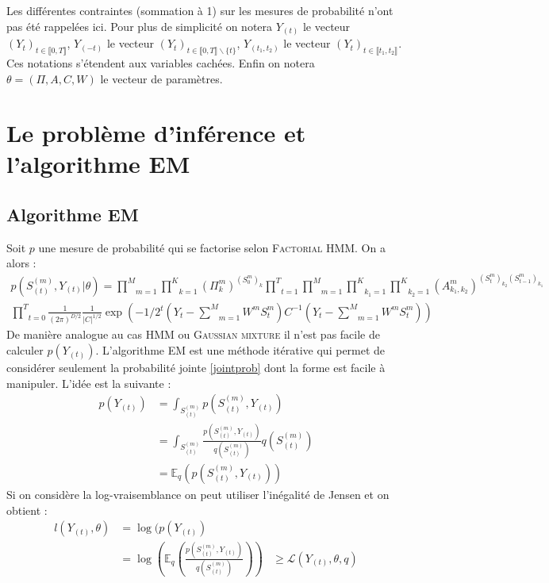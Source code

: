 \documentclass[10pt,a4paper]{article}
\newcommand{\hmm}{\textsc{HMM}}
\newcommand{\fhmm}{\textsc{Factorial HMM}}
\newcommand{\EM}{\textsc{EM}}
\begin{document}
Les différentes contraintes (sommation à 1) sur les mesures de probabilité 
n'ont pas été rappelées ici. Pour plus de simplicité on notera $Y_{(t)}$ le 
vecteur $(Y_t)_{t \in \llbracket 0,T \rrbracket}$, $Y_{(-t)}$ le vecteur 
$(Y_{t})_{t \in \llbracket 0,T \rrbracket\backslash \lbrace t \rbrace}$, 
$Y_{(t_1,t_2)}$ le vecteur $(Y_t)_{t \in \llbracket t_1,t_2 \rrbracket}$. Ces 
notations s'étendent aux variables cachées. Enfin on notera $\theta=(\Pi, 
A,C,W)$ le vecteur de paramètres.
\section{Le problème d'inférence et l'algorithme EM}
\subsection{Algorithme EM}
Soit $p$ une mesure de probabilité qui se factorise selon \fhmm. On a alors :
\begin{multline}
p(S_{(t)}^{(m)},Y_{(t)} \vert 
\theta)=\underset{m=1}{\overset{M}{\prod}}\underset{k=1}{\overset{K}{\prod}}
(\Pi_k^m)^{(S_0^m)_k}\underset{t=1}{\overset{T}{\prod}}\underset{m=1}{\overset{M
}{\prod}}\underset{k_1=1}{\overset{K}{\prod}}\underset{k_2=1}{\overset{K}{\prod}
}(A_{k_1,k_2}^m)^{(S_t^m)_{k_2}(S_{t-1}^m)_{k_1}}\\ 
\underset{t=0}{\overset{T}{\prod}}\frac{1}{(2\pi)^{D/2}}\frac{1}{\vert C  
\vert^{1/2}}\exp\left(-1/2 {}^t\left(Y_t- \underset{m=1}{\overset{M}{\sum}}W^m 
S_t^m \right)C^{-1} \left(Y_t- \underset{m=1}{\overset{M}{\sum}}W^m S_t^m 
\right)\right) \label{jointprob}
\end{multline}
De manière analogue au cas \hmm{} ou \textsc{Gaussian mixture} il n'est pas 
facile de calculer $p(Y_{(t)})$. L'algorithme \EM{} est une méthode itérative 
qui 
permet de considérer seulement la probabilité jointe \ref{jointprob} dont la 
forme est facile à manipuler. L'idée est la suivante :
\begin{equation}
\begin{aligned}
p(Y_{(t)})&=\int_{S_{(t)}^{(m)}}p(S_{(t)}^{(m)},Y_{(t)}) \\
&=\int_{S_{(t)}^{(m)}}\frac{p(S_{(t)}^{(m)},Y_{(t)})}{q(S_{(t)}^{(m)})}q(S_{(t)}
^{(m)}) \\
&=\mathbb{E}_q\left(p(S_{(t)}^{(m)},Y_{(t)}) \right)
\end{aligned}
\end{equation}
Si on considère la log-vraisemblance on peut utiliser l'inégalité de Jensen et 
on obtient :
\begin{equation}
\begin{aligned}
l(Y_{(t)},\theta)&=\log(p(Y_{(t)}) \\
&=\log\left( \mathbb{E}_q\left( 
\frac{p(S_{(t)}^{(m)},Y_{(t)})}{q(S_{(t)}^{(m)})} \right) \right)
&\ge \mathcal{L}(Y_{(t)},\theta,q)
\end{aligned}
\end{equation}
\end{document}
